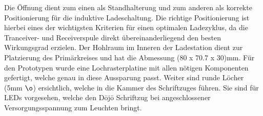 Die Öffnung dient zum einen als Standhalterung und zum anderen als korrekte Positionierung für die induktive Ladeschaltung. Die richtige Positionierung ist hierbei eines der wichtigsten Kriterien für einen optimalen Ladezyklus, da die Tranceiver- und Receiverspule direkt übereinanderliegend den besten Wirkungsgrad erzielen. Der Hohlraum im Inneren der Ladestation dient zur Platzierung des Primärkreises und hat die Abmessung (80 x 70.7 x 30)mm. Für den Prototypen wurde eine Lochrasterplatine mit allen nötigen Komponenten gefertigt, welche genau in diese Aussparung passt. Weiter sind runde Löcher (5mm $\o$) ersichtlich, welche in die Kammer des Schriftzuges führen. Sie sind für LEDs vorgesehen, welche den Dōjō Schriftzug bei angeschlossener Versorgungsspannung zum Leuchten bringt.